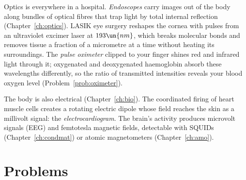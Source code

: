 Optics is everywhere in a hospital. \emph{Endoscopes} carry images out of the body along bundles of optical fibres that trap light by total internal reflection (Chapter~\ref{ch:optics}). LASIK eye surgery reshapes the cornea with pulses from an ultraviolet excimer laser at $193\un{nm}$, which breaks molecular bonds and removes tissue a fraction of a micrometre at a time without heating its surroundings. The \emph{pulse oximeter} clipped to your finger shines red and infrared light through it; oxygenated and deoxygenated haemoglobin absorb these wavelengths differently, so the ratio of transmitted intensities reveals your blood oxygen level (Problem~\ref{prob:oximeter}).

The body is also electrical (Chapter~\ref{ch:bio}). The coordinated firing of heart muscle cells creates a rotating electric dipole whose field reaches the skin as a millivolt signal: the \emph{electrocardiogram}. The brain's activity produces microvolt signals (EEG) and femtotesla magnetic fields, detectable with SQUIDs (Chapter~\ref{ch:condmat}) or atomic magnetometers (Chapter~\ref{ch:amo}).

\section{Problems}

